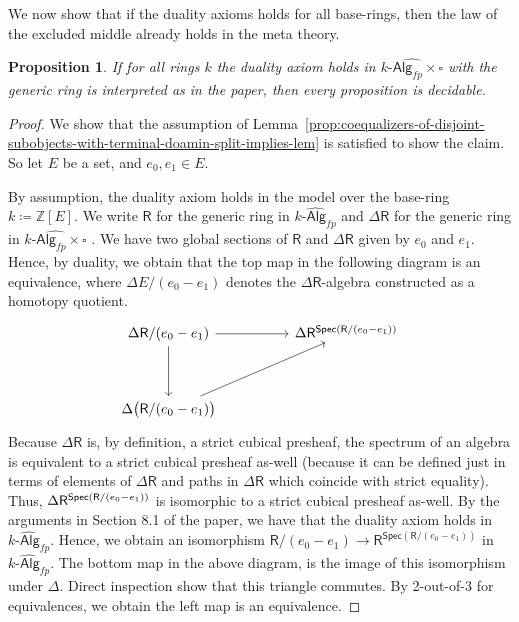 \documentclass[10pt,a4paper]{article}
\newtheorem{proposition}{Proposition}[section]
\newcommand{\ints}{\mathbb{Z}}
\newcommand{\Alg}{\mathsf{Alg}}
\DeclarePairedDelimiter\paren{(}{)}
\newcommand\R{\mathsf{R}}
\newcommand\Spec{\mathsf{Spec}}
\begin{document}
We now show that if the duality axioms holds for all base-rings, then the law of the excluded middle already holds in the meta theory.

\begin{proposition}\label{prop:strict-duality-implies-lem}
  If for all rings \(k\) the duality axiom holds in \(\widehat{k\text{-}\Alg_{fp} \times \square}\) with the generic ring is interpreted as in the paper, then every proposition is decidable.
\end{proposition}
\begin{proof}
  We show that the assumption of Lemma~\ref{prop:coequalizers-of-disjoint-subobjects-with-terminal-doamin-split-implies-lem} is satisfied to show the claim.
  So let $E$ be a set, and $e_0, e_1 \in E$.

  By assumption, the duality axiom holds in the model over the base-ring $k \coloneqq \ints[E]$.
  We write $\R$ for the generic ring in $\widehat{k\textsf{-Alg}_{fp}}$ and $\Delta\R$ for the generic ring in $\widehat{k\textsf{-Alg}_{fp} \times \square}$ .
  We have two global sections of $\R$ and $\Delta \R$ given by $e_0$ and $e_1$.
  Hence, by duality, we obtain that the top map in the following diagram is an equivalence, where $\Delta E/(e_0 - e_1)$ denotes the $\Delta\R$-algebra constructed as a homotopy quotient.
  \[\begin{tikzcd}
    \Delta\R/(e_0 - e_1) \arrow[dd] \arrow[rr]                &  & \Delta\R^{\Spec\paren{\R/(e_0 - e_1)}} \\
                                                   &  &                                  \\
    \Delta\paren[\big]{\R/(e_0 - e_1)} \arrow[rruu] &  &                                 
  \end{tikzcd}\]
  Because $\Delta\R$ is, by definition, a strict cubical presheaf, the spectrum of an algebra is equivalent to a strict cubical presheaf as-well (because it can be defined just in terms of elements of $\Delta \R$ and paths in $\Delta \R$ which coincide with strict equality).
  Thus, $\Delta\R^{\Spec\paren{\R/(e_0 - e_1)}}$ is isomorphic to a strict cubical presheaf as-well.
  By the arguments in Section 8.1 of the paper, we have that the duality axiom holds in $\widehat{k\textsf{-Alg}_{fp}}$.
  Hence, we obtain an isomorphism $\R/(e_0 - e_1) \to \R^{\Spec(\R / (e_0 - e_1))}$ in $\widehat{k\textsf{-Alg}_{fp}}$.
  The bottom map in the above diagram, is the image of this isomorphism under \(\Delta\).
  Direct inspection show that this triangle commutes.
  By 2-out-of-3 for equivalences, we obtain the left map is an equivalence.


\end{proof}
\end{document}
